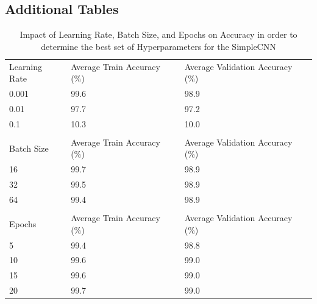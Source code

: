 \subsection{Additional Tables}\label{Appendixtables}

\begin{table}[ht]
    \caption{Impact of Learning Rate, Batch Size, and Epochs on Accuracy in order to determine the best set of Hyperparameters for the SimpleCNN}\label{table:lr_bs_ep}
    \centering
    \begin{tabular}{lll}
    \toprule
    \addlinespace
    \multicolumn{3}{c}{Learning Rate} \\
    \midrule
    Learning Rate & Average Train Accuracy (\%) & Average Validation Accuracy (\%) \\
    \midrule
    0.001 & 99.6 & 98.9 \\
    0.01  & 97.7 & 97.2 \\
    0.1   & 10.3 & 10.0 \\
    \midrule
    \addlinespace
    \addlinespace
    \multicolumn{3}{c}{Batch Size} \\
    \midrule
    Batch Size & Average Train Accuracy (\%) & Average Validation Accuracy (\%) \\
    \midrule
    16 & 99.7 & 98.9 \\
    32 & 99.5 & 98.9 \\
    64 & 99.4 & 98.9 \\
    \midrule
    \addlinespace
    \addlinespace
    \multicolumn{3}{c}{Epochs} \\
    \midrule
    Epochs & Average Train Accuracy (\%) & Average Validation Accuracy (\%) \\
    \midrule
    5  & 99.4 & 98.8 \\
    10 & 99.6 & 99.0 \\
    15 & 99.6 & 99.0 \\
    20 & 99.7 & 99.0 \\
    \bottomrule
    \end{tabular}
    \end{table}